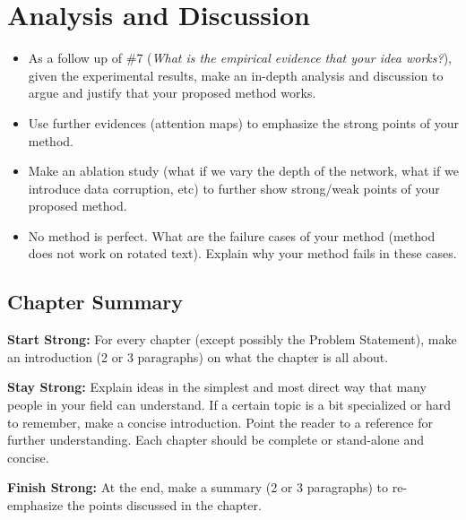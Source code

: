 \chapter{Analysis and Discussion}
\label{ch:analysis}

\begin{itemize}
    \item As a follow up of \#7 (\emph{What is the empirical evidence that your idea works?}), given the experimental results, make an in-depth analysis and discussion to argue and justify that your proposed method works.
    \item Use further evidences (\eg attention maps) to emphasize the strong points of your method.
    \item Make an ablation study (\eg what if we vary the depth of the network, what if we introduce data corruption, etc) to further show strong/weak points of your proposed method.
    \item No method is perfect. What are the failure cases of your method (\eg method does not work on rotated text). Explain why your method fails in these cases.
\end{itemize}

\section{Chapter Summary}

\textbf{Start Strong:} For every chapter (except possibly the Problem Statement), make an introduction (2 or 3 paragraphs) on what the chapter is all about.

\textbf{Stay Strong:} Explain ideas in the simplest and most direct way that many people in your field can understand. If a certain topic is a bit specialized or hard to remember, make a concise introduction. Point the reader to a reference for further understanding. Each chapter should be complete or stand-alone and concise.

\textbf{Finish Strong:} At the end, make a summary (2 or 3 paragraphs) to re-emphasize the points discussed in the chapter.

